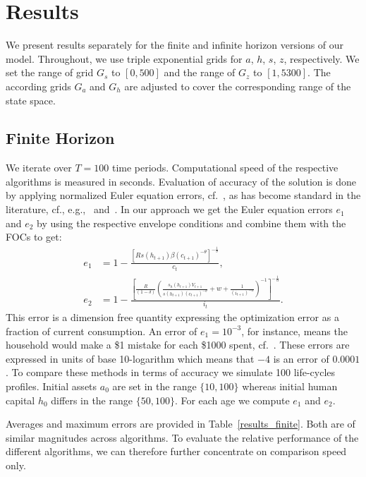 \documentclass[a4paper,12pt]{article}%
\begin{document}
\section{Results}

We present results separately for the finite and infinite horizon versions of our model. Throughout, we use triple exponential grids for $a$, $h$, $s$, $z$, respectively. We set the range of grid $G_{s}$ to $\left[ 0,500\right]$ and the range of $G_{z}$ to $\left[ 1,5300\right]$. The according grids $G_{a}$ and $G_{h}$ are adjusted to cover the corresponding range of the state space.

\subsection{Finite Horizon}

We iterate over $T=100$ time periods. Computational speed of the respective algorithms is measured in seconds. Evaluation of accuracy of the solution is done by applying normalized Euler equation errors, cf.~, as has become standard in the literature, cf., e.g.,~ and~. In our approach we get the Euler equation errors $e_{1}$ and $e_{2}$ by
using the respective envelope conditions and combine them with the FOCs to
get:
\begin{align*}
e_{1} & = 1 - \frac{\left[R s(h_{t+1}) \beta \left(c_{t+1}\right)^{-\theta}\right]^{-\frac{1}{\theta}}}{c_{t}}, \\
e_{2} & = 1 - \frac{\left[\frac{R}{\left(1 - \delta\right)} \left(\frac{s_{h}(h_{t+1}) V_{t+1}}{s(h_{t+1})\left(c_{t+1}\right)^{-\theta}} + w + \frac{1}{\left(i_{t+1}\right)^{-\alpha}}\right)^{-1}\right]^{-\frac{1}{\alpha}}}{i_{t}}.
\end{align*}
This error is a dimension free quantity expressing the optimization error as a fraction of current consumption. An error of $e_{1}=10^{-3}$, for instance, means the household would make a \$1 mistake for each \$1000 spent, cf.~. These errors are expressed in units of base 10-logarithm which means that $-4$ is an error of $0.0001$. To compare these methods in terms of accuracy we simulate 100 life-cycles profiles. Initial assets $a_{0}$ are set in the range $\{10,100\}$ whereas initial human capital $h_{0}$ differs in the range $\{50,100\}$. For each age we compute $e_{1}$ and $e_{2}$.

Averages and maximum errors are provided in Table~\ref{results_finite}. Both are of similar magnitudes across algorithms. To evaluate the relative performance of the different algorithms, we can therefore further concentrate on comparison speed only.
\end{document}
